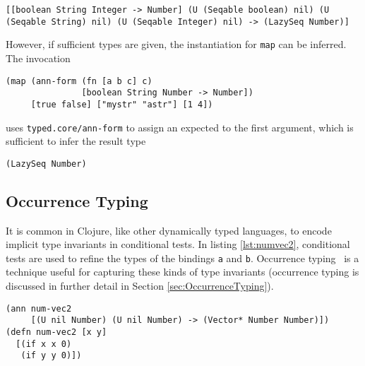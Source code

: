\begin{lstlisting}
[[boolean String Integer -> Number] (U (Seqable boolean) nil) (U (Seqable String) nil) (U (Seqable Integer) nil) -> (LazySeq Number)]
\end{lstlisting}

However, if sufficient types are given, the instantiation for \lstinline|map| can be inferred.
The invocation

\begin{lstlisting}
(map (ann-form (fn [a b c] c) 
               [boolean String Number -> Number]) 
     [true false] ["mystr" "astr"] [1 4])
\end{lstlisting}

uses \lstinline|typed.core/ann-form| to assign an expected to
the first argument,
which is sufficient to infer the result type

\begin{lstlisting}
(LazySeq Number)
\end{lstlisting}


\subsection{Occurrence Typing}

It is common in Clojure, like other dynamically typed languages, to
encode implicit type invariants in conditional tests.
In listing \ref{lst:numvec2}, conditional tests are used
to refine the types of the bindings \lstinline|a| and \lstinline|b|.
Occurrence typing~\cite{TF10} is a technique useful for capturing these kinds
of type invariants (occurrence typing is discussed in further detail in Section \ref{sec:OccurrenceTyping}).

\begin{lstlisting}[caption=Example of occurrence typing in Typed Clojure, label=lst:numvec2]
(ann num-vec2 
     [(U nil Number) (U nil Number) -> (Vector* Number Number)])
(defn num-vec2 [x y]
  [(if x x 0) 
   (if y y 0)])
\end{lstlisting}

